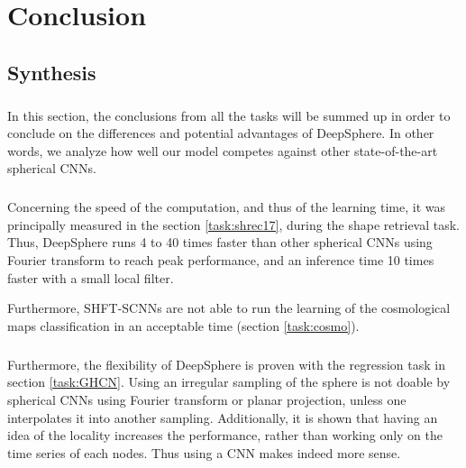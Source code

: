 \documentclass[11pt]{report}
\begin{document}





\chapter{Conclusion}
\section{Synthesis}
\paragraph*{}
In this section, the conclusions from all the tasks will be summed up in order to conclude on the differences and potential advantages of DeepSphere. In other words, we analyze how well our model competes against other state-of-the-art spherical CNNs.

\paragraph*{}
Concerning the speed of the computation, and thus of the learning time, it was principally measured in the section \ref{task:shrec17}, during the shape retrieval task. Thus, DeepSphere runs 4 to 40 times faster than other spherical CNNs using Fourier transform to reach peak performance, and an inference time 10 times faster with a small local filter.

Furthermore, SHFT-SCNNs are not able to run the learning of the cosmological maps classification in an acceptable time (section \ref{task:cosmo}).

\paragraph*{}
Furthermore, the flexibility of DeepSphere is proven with the regression task in section \ref{task:GHCN}. Using an irregular sampling of the sphere is not doable by spherical CNNs using Fourier transform or planar projection, unless one interpolates it into another sampling. Additionally, it is shown that having an idea of the locality increases the performance, rather than working only on the time series of each nodes. Thus using a CNN makes indeed more sense.
\end{document}
